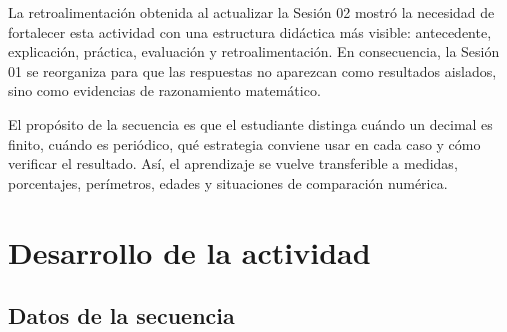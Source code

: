 \documentclass[
	spanish,
	letterpaper, oneside
]{article}
\begin{document}
La retroalimentación obtenida al actualizar la Sesión 02 mostró la necesidad de fortalecer esta actividad con una estructura didáctica más visible: antecedente, explicación, práctica, evaluación y retroalimentación. En consecuencia, la Sesión 01 se reorganiza para que las respuestas no aparezcan como resultados aislados, sino como evidencias de razonamiento matemático.

El propósito de la secuencia es que el estudiante distinga cuándo un decimal es finito, cuándo es periódico, qué estrategia conviene usar en cada caso y cómo verificar el resultado. Así, el aprendizaje se vuelve transferible a medidas, porcentajes, perímetros, edades y situaciones de comparación numérica.

%
%
\section{Desarrollo de la actividad}

\subsection{Datos de la secuencia}
\end{document}
